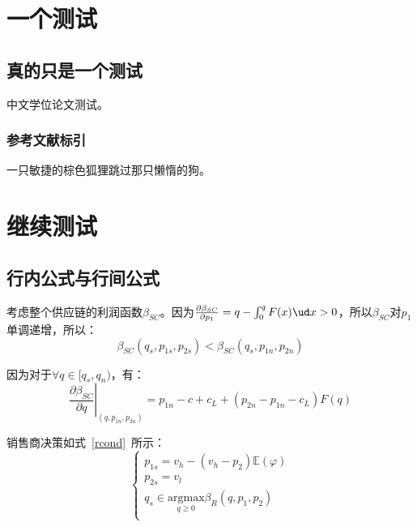 
\iffalse
\fi


\chapter{一个测试}

\section{真的只是一个测试}

中文学位论文测试\cite{chandrasekhar2003newton,arnold1990huygens}。

\subsection{参考文献标引}

一只敏捷的棕色狐狸跳过那只懒惰的狗\cite{chandrasekhar2003newton,arnold1990huygens}。

\chapter{继续测试}

\section{行内公式与行间公式}

考虑整个供应链的利润函数$\beta_{SC}$。因为$\frac{\partial\beta_{SC}}{\partial p_1}=q-\int_0^q F(x)\ud x>0$，所以$\beta_{SC}$对$p_1$单调递增，所以：
\begin{equation}
\label{dscNoStgProof0}
\beta_{SC}(q_s,p_{1s},p_{2s})<\beta_{SC}(q_s,p_{1n},p_{2n})
\end{equation}

因为对于$\forall q\in[q_s, q_n)$，有：
\[ \left.\frac{\partial \beta_{SC}}{\partial q}\right|_{(q,p_{1n},p_{2n})}=p_{1n}-c+c_L+(p_{2n}-p_{1n}-c_L)F(q) \]

销售商决策如式~\eqref{rcond}~所示：
\begin{equation}
\label{rcond}
\left\{\begin{array}{l}
p_{1s}=v_h-(v_h-p_2)\mathbb{E}(\varphi) \\
p_{2s}=v_l \\
q_s \in \underset{q \geq 0}{\mathrm{argmax}} \beta_R (q, p_1, p_2) \\
\end{array}\right.
\end{equation}

